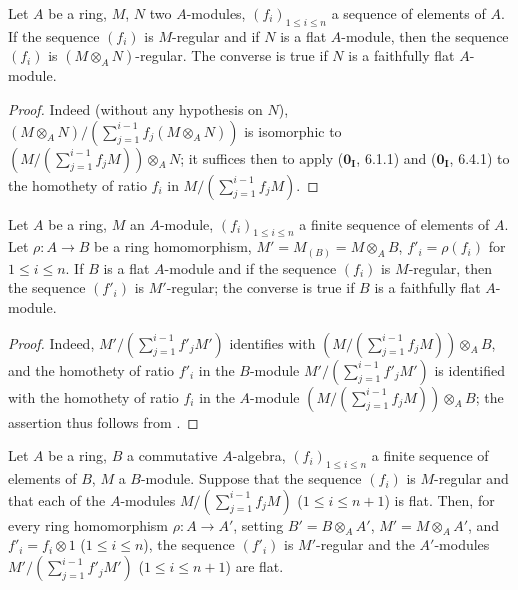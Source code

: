 \begin{proposition}[15.1.13]
\label{0.15.1.13}
Let $A$ be a ring, $M$, $N$ two $A$-modules, $(f_i)_{1\leq i\leq n}$ a sequence of elements of $A$.
If the sequence $(f_i)$ is $M$-regular and if $N$ is a flat $A$-module, then the sequence $(f_i)$ is $(M\otimes_AN)$-regular.
The converse is true if $N$ is a faithfully flat $A$-module.
\end{proposition}

\begin{proof}
Indeed (without any hypothesis on $N$), $(M\otimes_AN)/(\sum_{j=1}^{i-1}f_j(M\otimes_AN))$ is isomorphic to $(M/(\sum_{j=1}^{i-1}f_jM))\otimes_AN$;
it suffices then to apply ($\mathbf{0_I}$, 6.1.1) and ($\mathbf{0_I}$, 6.4.1) to the homothety of ratio $f_i$ in $M/(\sum_{j=1}^{i-1}f_jM)$.
\end{proof}

\begin{corollary}[15.1.14]
\label{0.15.1.14}
Let $A$ be a ring, $M$ an $A$-module, $(f_i)_{1\leq i\leq n}$ a finite sequence of elements of $A$.
Let $\rho:A\to B$ be a ring homomorphism, $M'=M_{(B)}=M\otimes_AB$, $f'_i=\rho(f_i)$ for $1\leq i\leq n$.
If $B$ is a flat $A$-module and if the sequence $(f_i)$ is $M$-regular, then the sequence $(f'_i)$ is $M'$-regular;
the converse is true if $B$ is a faithfully flat $A$-module.
\end{corollary}

\begin{proof}
Indeed, $M'/(\sum_{j=1}^{i-1}f'_jM')$ identifies with $(M/(\sum_{j=1}^{i-1}f_jM))\otimes_AB$, and the homothety of ratio $f'_i$ in the $B$-module $M'/(\sum_{j=1}^{i-1}f'_jM')$ is identified with the homothety of ratio $f_i$ in the $A$-module $(M/(\sum_{j=1}^{i-1}f_jM))\otimes_AB$;
the assertion thus follows from .
\end{proof}

\begin{proposition}[15.1.15]
\label{0.15.1.15}
Let $A$ be a ring, $B$ a commutative $A$-algebra, $(f_i)_{1\leq i\leq n}$ a finite sequence of elements of $B$, $M$ a $B$-module.
Suppose that the sequence $(f_i)$ is $M$-regular and that each of the $A$-modules $M/(\sum_{j=1}^{i-1}f_jM)$ ($1\leq i\leq n+1$) is flat.
Then, for every ring homomorphism $\rho:A\to A'$, setting $B'=B\otimes_AA'$, $M'=M\otimes_AA'$, and $f'_i=f_i\otimes 1$ \textup{($1\leq i\leq n$)}, the sequence $(f'_i)$ is $M'$-regular and the $A'$-modules $M'/(\sum_{j=1}^{i-1}f'_jM')$ ($1\leq i\leq n+1$) are flat.
\end{proposition}

